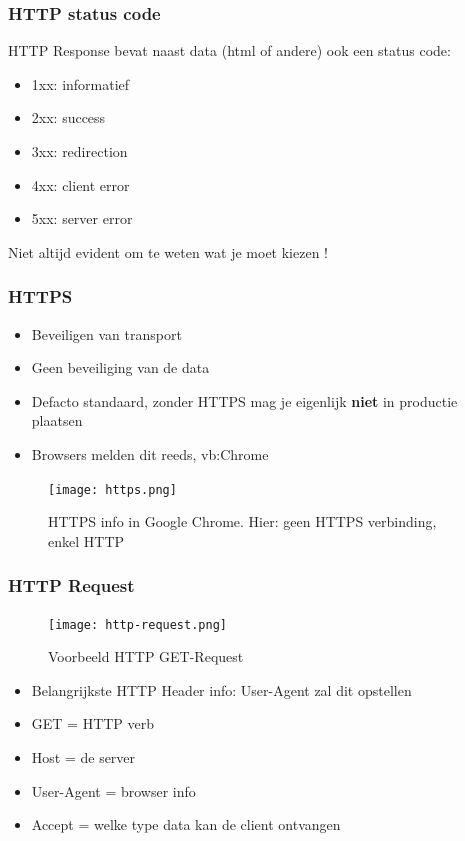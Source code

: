 \documentclass{article}
\newcommand{\bold}[1]{\textbf{#1}}
\begin{document}
\subsubsection{HTTP status code}
HTTP Response bevat naast data (html of andere) ook een status code: 

\begin{itemize}
    \item 1xx: informatief
    \item 2xx: success
    \item 3xx: redirection
    \item 4xx: client error
    \item 5xx: server error
\end{itemize}

Niet altijd evident om te weten wat je moet kiezen !

\subsubsection{HTTPS}

\begin{itemize}
    \item Beveiligen van transport
    \item Geen beveiliging van de data
    \item Defacto standaard, zonder HTTPS mag je eigenlijk \bold{niet} in productie plaatsen
    \item Browsers melden dit reeds, vb:Chrome
\end{itemize}

\begin{figure}[H]
    \centering
    \texttt{[image: https.png]}
    \caption{HTTPS info in Google Chrome. Hier: geen HTTPS verbinding, enkel HTTP}
\end{figure}

\subsubsection{HTTP Request}
\begin{figure}[H]
    \centering
    \texttt{[image: http-request.png]}
    \caption{Voorbeeld HTTP GET-Request}
\end{figure}

\begin{itemize}
    \item Belangrijkste HTTP Header info: User-Agent zal dit opstellen
    \item GET = HTTP verb
    \item Host = de server
    \item User-Agent = browser info
    \item Accept = welke type data kan de client ontvangen
\end{itemize}
\end{document}
